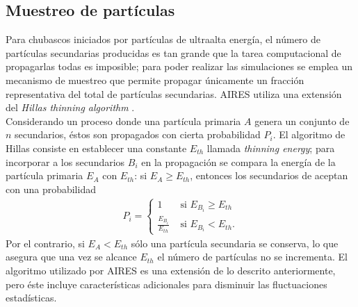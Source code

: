 	\subsection{Muestreo de partículas}
	Para chubascos iniciados por partículas de ultraalta energía, el número de partículas secundarias producidas es tan grande que la tarea computacional de propagarlas todas es imposible; para poder realizar las simulaciones se emplea un mecanismo de muestreo que permite propagar únicamente un fracción representativa del total de partículas secundarias. AIRES utiliza una extensión del \textit{Hillas thinning algorithm} \cite{Kobal2001}. \\
	
	Considerando un proceso donde una partícula primaria $A$ genera un conjunto de $n$ secundarios, éstos son propagados con cierta probabilidad $P_i$. El algoritmo de Hillas consiste en establecer una constante $E_{th}$ llamada \textit{thinning energy}; para incorporar a los secundarios $B_i$ en la propagación se compara la energía de la partícula primaria $E_A$ con $E_{th}$: si $E_A \geq E_{th}$, entonces los secundarios de aceptan con una probabilidad
	\begin{align}
	P_i = \begin{cases}
	1 & \text{ si } E_{B_i} \geq E_{th} \\
	\frac{E_{B_i}}{E_{th}} & \text{ si } E_{B_i} < E_{th}.
	\end{cases}
	\end{align}
	Por el contrario, si $E_A < E_{th}$ sólo una partícula secundaria se conserva, lo que asegura que una vez se alcance $E_{th}$ el número de partículas no se incrementa. El algoritmo utilizado por AIRES es una extensión de lo descrito anteriormente, pero éste incluye características adicionales para disminuir las fluctuaciones estadísticas.

\singlespacing